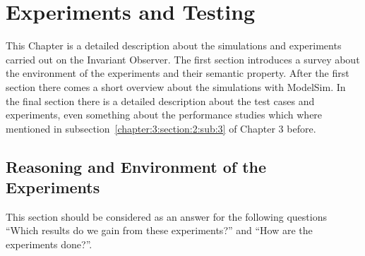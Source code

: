 \chapter{Experiments and Testing}
\label{chapter:4}

\ifpdf
    \graphicspath{{Chapter3/Figs/Raster/}{Chapter3/Figs/PDF/}{Chapter3/Figs/}}
\else
    \graphicspath{{Chapter3/Figs/Vector/}{Chapter3/Figs/}}
\fi

This Chapter is a detailed description about the simulations and experiments carried out on the Invariant Observer.
The first section introduces a survey about the environment of the experiments and their semantic property.
After the first section there comes a short overview  about the simulations with ModelSim.
In the final section there is a detailed description about the test cases and experiments, even something about the performance studies which where
mentioned in subsection~\ref{chapter:3:section:2:sub:3} of Chapter 3 before. \\



\section{Reasoning and Environment of the Experiments}
\label{chapter:4:section:1}
This section should be considered as an answer for the following questions ``Which results do we gain from these experiments?'' and ``How are the experiments done?''. 

